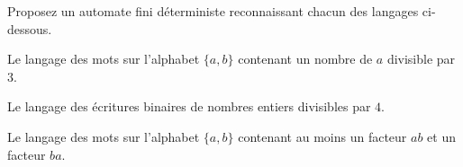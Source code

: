 
\begingroup

\begin{exercice}\label{exo:lexing/automata/write_automata}

  Proposez un automate fini déterministe reconnaissant chacun des langages ci-dessous.
  \begin{question}
  \item Le langage des mots sur l'alphabet $\{a,b\}$ contenant un nombre de $a$ divisible par $3$. 
  \item Le langage des écritures binaires de nombres entiers divisibles par $4$. 
  \item Le langage des mots sur l'alphabet $\{a,b\}$ contenant au moins un facteur $ab$ et un facteur $ba$. 
  \end{question}

\end{exercice}

\endgroup
\endinput
